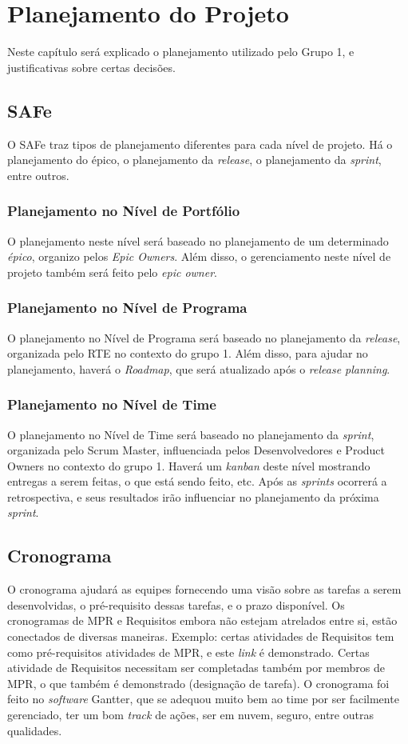 \chapter[Planejamento do Projeto]{Planejamento do Projeto}
Neste capítulo será explicado o planejamento utilizado pelo Grupo 1, e justificativas sobre certas decisões.

\section{SAFe}
O SAFe traz tipos de planejamento diferentes para cada nível de projeto. Há o planejamento do épico, o planejamento da \emph{release}, o planejamento da \emph{sprint}, entre outros.

\subsection{Planejamento no Nível de Portfólio}
O planejamento neste nível será baseado no planejamento de um determinado \emph{épico}, organizo pelos \emph{Epic Owners}. Além disso, o gerenciamento neste nível de projeto também será feito pelo \emph{epic owner}.

\subsection{Planejamento no Nível de Programa}
O planejamento no Nível de Programa será baseado no planejamento da \emph{release}, organizada pelo RTE no contexto do grupo 1. Além disso, para ajudar no planejamento, haverá o \emph{Roadmap}, que será atualizado após o \emph{release planning}.

\subsection{Planejamento no Nível de Time}
O planejamento no Nível de Time será baseado no planejamento da \emph{sprint}, organizada pelo Scrum Master, influenciada pelos Desenvolvedores e Product Owners no contexto do grupo 1. Haverá um \emph{kanban} deste nível mostrando entregas a serem feitas, o que está sendo feito, etc. Após as \emph{sprints} ocorrerá a retrospectiva, e seus resultados irão influenciar no planejamento da próxima \emph{sprint}.

\section{Cronograma}
O cronograma ajudará as equipes fornecendo uma visão sobre as tarefas a serem desenvolvidas, o pré-requisito dessas tarefas, e o prazo disponível. Os cronogramas de MPR e Requisitos embora não estejam atrelados entre si, estão conectados de diversas maneiras. Exemplo: certas atividades de Requisitos tem como pré-requisitos atividades de MPR, e este \emph{link} é demonstrado. Certas atividade de Requisitos necessitam ser completadas também por membros de MPR, o que também é demonstrado (designação de tarefa). O cronograma foi feito no \emph{software} Gantter, que se adequou muito bem ao time por ser facilmente gerenciado, ter um bom \emph{track} de ações, ser em nuvem, seguro, entre outras qualidades.

